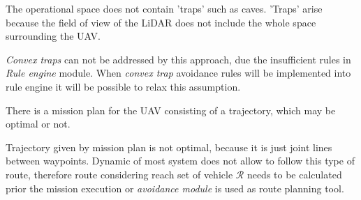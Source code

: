 \begin{assumption}{The operational space does not contain 'traps' such as caves. 'Traps' arise because the field of view of the LiDAR does not include the whole space surrounding the UAV.}\label{ass:5}\end{assumption}
\noindent \textit{Convex traps} can not be addressed by this approach, due the insufficient rules in \textit{Rule engine} module. When \textit{convex trap} avoidance rules will be implemented into rule engine it will be possible to relax this assumption.

\begin{assumption}{There is a mission plan for the UAV consisting of a trajectory, which may be optimal or not.}\label{ass:6}\end{assumption}

\noindent Trajectory given by mission plan is not optimal, because it is just joint lines between waypoints. Dynamic of most system does not allow to follow this type of route, therefore route considering reach set of vehicle $\mathscr{R}$ needs to be calculated prior the mission execution or \textit{avoidance module} is used as route planning tool. 